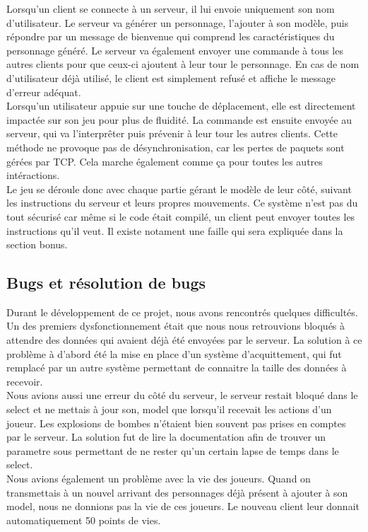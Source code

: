 \documentclass[12pt]{article}
\begin{document}
Lorsqu'un client se connecte à un serveur, il lui envoie uniquement son nom d'utilisateur. Le serveur va générer un personnage, l'ajouter à son modèle, puis répondre par un message de bienvenue qui comprend les caractéristiques du personnage généré. Le serveur va également envoyer une commande à tous les autres clients pour que ceux-ci ajoutent à leur tour le personnage. En cas de nom d'utilisateur déjà utilisé, le client est simplement refusé et affiche le message d'erreur adéquat.
\\

Lorsqu'un utilisateur appuie sur une touche de déplacement, elle est directement impactée sur son jeu pour plus de fluidité. La commande est ensuite envoyée au serveur, qui va l'interprêter puis prévenir à leur tour les autres clients. Cette méthode ne provoque pas de désynchronisation, car les pertes de paquets sont gérées par TCP. Cela marche également comme ça pour toutes les autres intéractions.
\\
Le jeu se déroule donc avec chaque partie gérant le modèle de leur côté, suivant les instructions du serveur et leurs propres mouvements. Ce système n'est pas du tout sécurisé car même si le code était compilé, un client peut envoyer toutes les instructions qu'il veut. Il existe notament une faille qui sera expliquée dans la section bonus.

\subsection{Bugs et résolution de bugs}
Durant le développement de ce projet, nous avons rencontrés quelques difficultés. Un des premiers dysfonctionnement était que nous nous retrouvions bloqués à attendre des données qui avaient déjà été envoyées par le serveur. La solution à ce problème à d'abord été la mise en place d'un système d'acquittement, qui fut remplacé par un autre système permettant de connaitre la taille des données à recevoir.
\\
Nous avions aussi une erreur du côté du serveur, le serveur restait bloqué dans le select et ne mettais à jour son, model que lorsqu'il recevait les actions d'un joueur. Les explosions de bombes n'étaient bien souvent pas prises en comptes par le serveur. La solution fut de lire la documentation afin de trouver un parametre sous permettant de ne rester qu'un certain lapse de temps dans le select.\\

Nous avions également un problème avec la vie des joueurs. Quand on transmettais à un nouvel arrivant des personnages déjà présent à ajouter à son model, nous ne donnions pas la vie de ces joueurs. Le nouveau client leur donnait automatiquement 50 points de vies.\\
\end{document}
